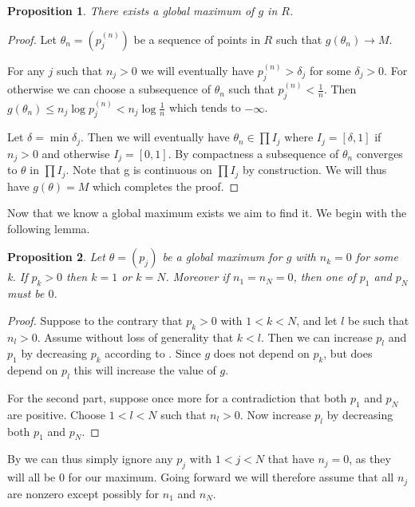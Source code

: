 \documentclass{article}
\theoremstyle{plain}
\newtheorem{proposition} {\bf Proposition} [section]
\theoremstyle{definition}
\begin{document}
\begin{proposition}
	There exists a global maximum of $g$ in $R$.
\end{proposition}
\begin{proof}
	Let $\theta_n=(p_j^{(n)})$ be a sequence of points in $R$ such that
	$g(\theta_n)\to M$.

	For any $j$ such that $n_j>0$ we will eventually have $p_j^{(n)}>\delta_j$
	for some $\delta_j>0$. For otherwise we can choose a subsequence of $\theta_n$ such that
	$p_j^{(n)}<\frac1n$. Then $g(\theta_n)\leq n_j\log p_j^{(n)}<n_j\log\frac1n$ which tends
	to $-\infty$.

	Let $\delta=\min \delta_j$. Then we will eventually have $\theta_n\in\prod
	I_j$ where $I_j=[\delta, 1]$ if $n_j>0$ and otherwise $I_j=[0,1]$. By compactness a
	subsequence of $\theta_n$ converges to $\theta$ in $\prod I_j$. Note that g is continuous
	on $\prod I_j$ by construction. We will thus have $g(\theta)=M$ which completes the proof.
\end{proof}

Now that we know a global maximum exists we aim to find it. We begin with the following lemma.

\begin{proposition}\label{pzero}
	Let $\theta=(p_j)$ be a global maximum for $g$ with $n_k=0$ for some k. If $p_k>0$
	then 
	$k=1$ or $k=N$. Moreover if $n_1=n_N=0$, then one of $p_1$ and $p_N$ must be $0$.
\end{proposition}
\begin{proof}
	Suppose to the contrary that $p_k>0$ with $1<k<N$, and let $l$ be such that $n_l>0$.
	Assume without loss of generality that $k<l$. Then we can increase $p_l$ and $p_1$
	by decreasing $p_k$ according to . Since $g$ does not depend on $p_k$,
	but does depend on $p_l$ this will increase the value of $g$.

	For the second part, suppose once more for a contradiction that both $p_1$ and $p_N$
	are positive. Choose $1<l<N$ such that $n_l>0$. Now increase $p_l$ by decreasing
	both $p_1$ and $p_N$.
\end{proof}

By  we can thus simply ignore any $p_j$ with $1<j<N$ that have $n_j=0$, as they
will all be $0$ for our maximum. Going forward we will therefore assume that all $n_j$ are
nonzero except possibly for $n_1$ and $n_N$.
\end{document}
